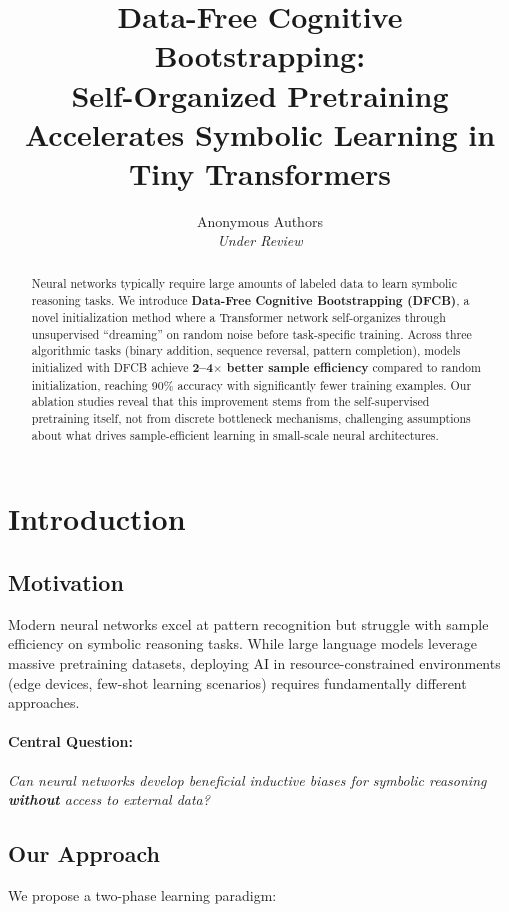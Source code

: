 \documentclass[11pt,twocolumn]{article}
\title{\textbf{Data-Free Cognitive Bootstrapping: \\
Self-Organized Pretraining Accelerates Symbolic Learning in Tiny Transformers}}
\author{
    Anonymous Authors \\
    \textit{Under Review}
}
\date{}
\newcommand{\method}{DFCB}
\newcommand{\methodfull}{Data-Free Cognitive Bootstrapping}
\begin{document}
\maketitle

\begin{abstract}
Neural networks typically require large amounts of labeled data to learn symbolic reasoning tasks. We introduce \textbf{\methodfull{} (\method{})}, a novel initialization method where a Transformer network self-organizes through unsupervised ``dreaming'' on random noise before task-specific training. Across three algorithmic tasks (binary addition, sequence reversal, pattern completion), models initialized with \method{} achieve \textbf{2--4$\times$ better sample efficiency} compared to random initialization, reaching 90\% accuracy with significantly fewer training examples. Our ablation studies reveal that this improvement stems from the self-supervised pretraining itself, not from discrete bottleneck mechanisms, challenging assumptions about what drives sample-efficient learning in small-scale neural architectures.
\end{abstract}

\section{Introduction}

\subsection{Motivation}

Modern neural networks excel at pattern recognition but struggle with sample efficiency on symbolic reasoning tasks. While large language models leverage massive pretraining datasets, deploying AI in resource-constrained environments (edge devices, few-shot learning scenarios) requires fundamentally different approaches.

\paragraph{Central Question:}
\textit{Can neural networks develop beneficial inductive biases for symbolic reasoning \textbf{without} access to external data?}

\subsection{Our Approach}

We propose a two-phase learning paradigm:
\end{document}

